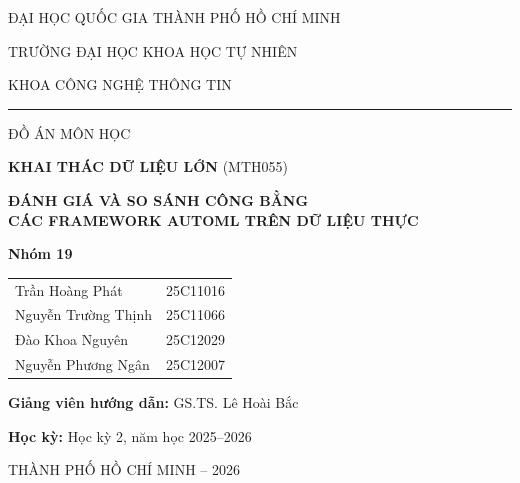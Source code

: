 \begin{titlepage}
\centering
{\large ĐẠI HỌC QUỐC GIA THÀNH PHỐ HỒ CHÍ MINH\par}
{\large TRƯỜNG ĐẠI HỌC KHOA HỌC TỰ NHIÊN\par}
{\large KHOA CÔNG NGHỆ THÔNG TIN\par}
\vspace{0.3cm}
\rule{0.5\linewidth}{0.4pt}\par

\vspace{1.2cm}

{\large ĐỒ ÁN MÔN HỌC\par}
{\large \textbf{KHAI THÁC DỮ LIỆU LỚN} (MTH055)\par}
\vspace{1.8cm}

{\Large\bfseries ĐÁNH GIÁ VÀ SO SÁNH CÔNG BẰNG\\[0.3cm]
CÁC FRAMEWORK AUTOML TRÊN DỮ LIỆU THỰC\par}
\vspace{1.8cm}

{\large \textbf{Nhóm 19}\par}
\vspace{0.4cm}
\begin{tabular}{ll}
{Trần Hoàng Phát} & {25C11016} \\
{Nguyễn Trường Thịnh} & {25C11066} \\
{Đào Khoa Nguyên} & {25C12029} \\
{Nguyễn Phương Ngân} & {25C12007} \\

\end{tabular}
\vspace{1.5cm}

{\large \textbf{Giảng viên hướng dẫn:} GS.TS. Lê Hoài Bắc\par}
\vspace{0.3cm}
{\large \textbf{Học kỳ:} Học kỳ 2, năm học 2025--2026\par}
\vfill

{\large THÀNH PHỐ HỒ CHÍ MINH -- 2026\par}
\end{titlepage}
